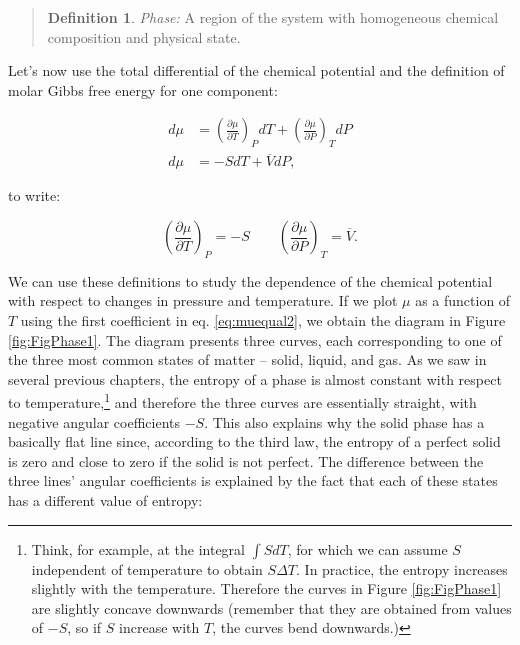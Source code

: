\documentclass[
  9pt,
]{extbook}
\theoremstyle{definition}
\newtheorem{definition}{Definition}[chapter]
\theoremstyle{definition}
\theoremstyle{definition}
\theoremstyle{remark}
\begin{document}
\begin{quote}
\begin{definition}
\protect\hypertarget{def:phasedef}{}{\label{def:phasedef} }\emph{Phase:} A region of the system with homogeneous chemical composition and physical state.
\end{definition}
\end{quote}

Let's now use the total differential of the chemical potential and the definition of molar Gibbs free energy for one component:

\begin{equation}
\begin{aligned}
d\mu &= \left( \frac{\partial \mu}{\partial T} \right)_P dT + \left( \frac{\partial \mu}{\partial P} \right)_T dP \\
d\mu &= -SdT+\overline{V}dP,
\end{aligned}
\label{eq:muequal1}
\end{equation}

to write:

\begin{equation}
\left( \frac{\partial \mu}{\partial T} \right)_P=-S \qquad \left( \frac{\partial \mu}{\partial P} \right)_T =\overline{V}.
\label{eq:muequal2}
\end{equation}

We can use these definitions to study the dependence of the chemical potential with respect to changes in pressure and temperature. If we plot \(\mu\) as a function of \(T\) using the first coefficient in eq. \eqref{eq:muequal2}, we obtain the diagram in Figure \ref{fig:FigPhase1}. The diagram presents three curves, each corresponding to one of the three most common states of matter -- solid, liquid, and gas. As we saw in several previous chapters, the entropy of a phase is almost constant with respect to temperature,\footnote{Think, for example, at the integral \(\int SdT\), for which we can assume \(S\) independent of temperature to obtain \(S\Delta T\). In practice, the entropy increases slightly with the temperature. Therefore the curves in Figure \ref{fig:FigPhase1} are slightly concave downwards (remember that they are obtained from values of \(-S\), so if \(S\) increase with \(T\), the curves bend downwards.)} and therefore the three curves are essentially straight, with negative angular coefficients \(-S\). This also explains why the solid phase has a basically flat line since, according to the third law, the entropy of a perfect solid is zero and close to zero if the solid is not perfect. The difference between the three lines' angular coefficients is explained by the fact that each of these states has a different value of entropy:
\end{document}
